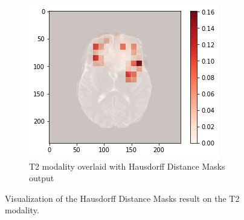 \begin{figure}[H]
\begin{subfigure}[t]{.315\textwidth}
    \end{subfigure}\hfill%
    \begin{subfigure}[t]{.315\textwidth}
        \centering
        \includegraphics[width=\linewidth]{chapters/07_brats3d/images/11_t2_hdm.png}
        \caption{T2 modality overlaid with Hausdorff Distance Masks output}
    \end{subfigure}
    \caption{Visualization of the Hausdorff Distance Masks result on the T2 modality.}
    \label{brats3d_t2}
\end{figure}

